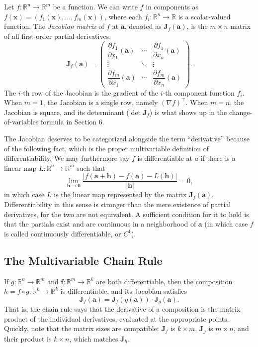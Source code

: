 \documentclass{article}
\begin{document}
Let $f: \mathbb{R}^n \to \mathbb{R}^m$ be a function. We can write $f$ in components as $f(\mathbf{x}) = (f_1(\mathbf{x}), \ldots, f_m(\mathbf{x}))$, where each $f_i: \mathbb{R}^n \to \mathbb{R}$ is a scalar-valued function. The \textit{Jacobian matrix} of $f$ at $\mathbf{a}$, denoted as $\mathbf{J}_f(\mathbf{a})$, is the $m \times n$ matrix of all first-order partial derivatives:
$$\mathbf{J}_f(\mathbf{a}) = \begin{pmatrix}
\dfrac{\partial f_1}{\partial x_1}(\mathbf{a}) & \cdots & \dfrac{\partial f_1}{\partial x_n}(\mathbf{a}) \\[1em]
\vdots & \ddots & \vdots \\[0.5em]
\dfrac{\partial f_m}{\partial x_1}(\mathbf{a}) & \cdots & \dfrac{\partial f_m}{\partial x_n}(\mathbf{a})
\end{pmatrix}.$$
The $i$-th row of the Jacobian is the gradient of the $i$-th component function $f_i$. When $m = 1$, the Jacobian is a single row, namely $(\nabla f)^\top$. When $m = n$, the Jacobian is square, and its determinant ($\det \textbf{J}_f$) is what shows up in the change-of-variables formula in Section 6.

The Jacobian deserves to be categorized alongside the term ``derivative'' because of the following fact, which is the proper multivariable definition of differentiability. We may furthermore say $f$ is differentiable at $a$ if there is a linear map $L : \mathbb{R}^n \to \mathbb{R}^m$ such that
$$\lim_{\mathbf{h} \to \mathbf{0}} \frac{|f(\mathbf{a} + \mathbf{h}) - f(\mathbf{a}) - L(\mathbf{h})|}{|\mathbf{h}|} = 0,$$
in which case $L$ is the linear map represented by the matrix $\mathbf{J}_f(\mathbf{a})$. Differentiability in this sense is stronger than the mere existence of partial derivatives, for the two are not equivalent. A sufficient condition for it to hold is that the partials exist and are continuous in a neighborhood of $\mathbf{a}$ (in which case $f$ is called continuously differentiable, or $C^1$).

\subsection{The Multivariable Chain Rule}

If $g: \mathbb{R}^n \to \mathbb{R}^m$ and $\mathbf{f}: \mathbb{R}^m \to \mathbb{R}^k$ are both differentiable, then the composition $h = f \circ g : \mathbb{R}^n \to \mathbb{R}^k$ is differentiable, and its Jacobian satisfies
$$\textbf{J}_f(\mathbf{a}) = \textbf{J}_f(g(\mathbf{a})) \cdot \textbf{J}_g(\mathbf{a}).$$
That is, the chain rule says that the derivative of a composition is the matrix product of the individual derivatives, evaluated at the appropriate points. Quickly, note that the matrix sizes are compatible: $\textbf{J}_f$ is $k \times m$, $\textbf{J}_g$ is $m \times n$, and their product is $k \times n$, which matches $\textbf{J}_h$.
\end{document}
